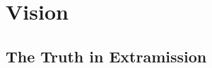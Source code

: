 \chapter{Vision} %
\label{cha:vision}

\section{The Truth in Extramission} %
\label{sec:the_truth_in_extramission}


